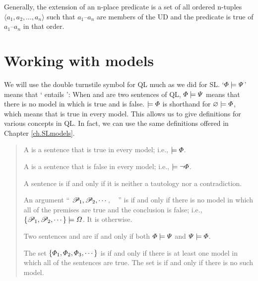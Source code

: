 Generally, the extension of an n-place predicate is a set of all ordered n-tuples ${\langle}a_1, a_2,\ldots, a_n{\rangle}$ such that $a_1$--$a_n$ are members of the UD and the predicate is true of $a_1$--$a_n$ in that order.







\section{Working with models}
\label{sec.UsingModels}


We will use the double turnstile symbol for QL much as we did for SL. `$\varPhi{}\models\varPsi{}$' means that `\metaA{} entails \metaB{}': When \metaA{} and \metaB{} are two sentences of QL, $\varPhi{}\models\varPsi{}$ means that there is no model in which \metaA{} is true and \metaB{} is false. $\models\varPhi{}$ is shorthand for $\varnothing\models\varPhi{}$, which means that \metaA{} is true in every model. This allows us to give definitions for various concepts in QL. In fact, we can use the same definitions offered in Chapter \ref{ch.SLmodels}.

\begin{quote}
A  is a sentence \metaA{} that is true in every model; i.e.,  $\models\varPhi{}$.

A  is a sentence \metaA{} that is false in every model; i.e., $\models\neg\varPhi{}$.

A sentence is  if and only if it is neither a tautology nor a contradiction.

An argument `` $\mathscr{P}_1, \mathscr{P}_2, \cdots$, \therefore\ \metaC{} '' is  if and only if there is no model in which all of the premises are true and the conclusion is false; i.e., $\{\mathscr{P}_1,\mathscr{P}_2,\cdots\}\models\varOmega{}$. It is  otherwise.

Two sentences \metaA{} and \metaB{} are  if and only if both $\varPhi{}\models\varPsi{}$ and $\varPsi{}\models\varPhi{}$.

The set $\{\varPhi{}_1,\varPhi{}_2,\varPhi{}_3,\cdots\}$ is  if and only if there is at least one model in which all of the sentences are true. The set is  if and only if there is no such model.

\end{quote}



